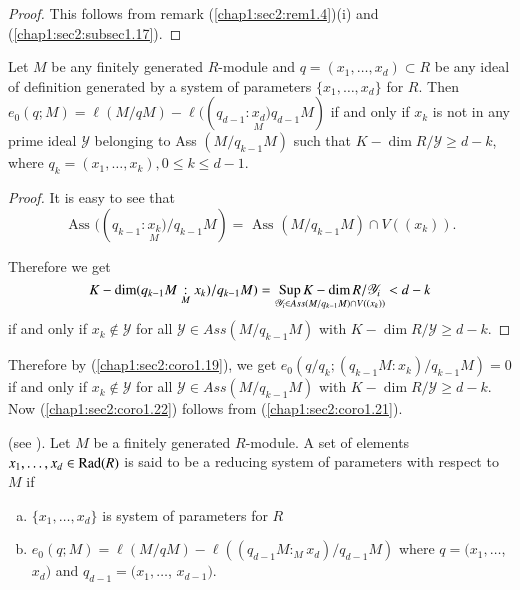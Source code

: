 \begin{proof}
  This follows from remark (\ref{chap1:sec2:rem1.4})(i) and
  (\ref{chap1:sec2:subsec1.17}). 
\end{proof}

\begin{corollary}\label{chap1:sec2:coro1.22}
 Let $M$ be any finitely generated $R$-module and $q=(x_1,
  \ldots, x_d) \subset R$ be any ideal of definition generated by a
  system of parameters $\{x_1, \ldots, x_d\}$ for $R$. Then
  $e_0(q;M)=\ell(M/qM)-\ell((q_{d-1}\underset{M}{:x_d)}q_{d-1} M)$ if
  and only if $x_k$ is not in any prime ideal $\mathscr{Y}$ belonging
  to Ass $(M/q_{k-1}M)$ such that $K-\dim R/\mathscr{Y} \geq d-k$,
  where $q_k =(x_1, \ldots, x_k), 0 \leq k \leq d-1$. 
\end{corollary}

\begin{proof}
  It is easy to see that 
  $$
  \text{ Ass } ((q_{k-1}\underset{M}{:x_k)}/q_{k-1}M)=\text{ Ass
  }(M/q_{k-1}M)\cap V((x_k)).  
  $$
  
  Therefore we get
  $$
  K-\dim(q_{k-1}M\underset{M}{:}x_k)/q_{k-1}M)= \underset {\mathscr{Y}_i
    \in Ass (M/q_{k-1}M)\cap V((x_k))}{\operatorname{Sup} K-\dim R/\mathscr{Y}_i} <d-k 
  $$
  if and only if $x_k \notin \mathscr{Y}$ for all $\mathscr{Y} \in Ass
  (M/q_{k-1}M)$ with $K-\dim R/\mathscr{Y} \geq d-k$.  
\end{proof}

Therefore by (\ref{chap1:sec2:coro1.19}), we get
$e_0(q/q_k;(q_{k-1}M:x_k)/q_{k-1}M)=0$ if and only if $x_k \notin
\mathscr{Y}$ for all $\mathscr{Y} \in Ass (M/q_{k-1}M)$ with $K-\dim
R/\mathscr{Y}\geq d-k$. Now (\ref{chap1:sec2:coro1.22}) follows from
(\ref{chap1:sec2:coro1.21}).   

\setcounter{definition}{22}
\begin{definition}\label{chap1:sec2:def1.23}
  (see \cite{2}). Let $M$ be a finitely generated $R$-module. A set of
  elements $x_1, \ldots, x_d \in \operatorname{Rad} (R)$ is said to be a 
  reducing system of parameters with respect to $M$ if  
  \begin{enumerate}[(a)]
  \item $\{ x_1, \ldots, x_d\}$ is system of parameters for $R$
  \item $e_0 (q; M) = \ell (M / q M ) -\ell ((q_{d-1}M:_M x_d)
    /q_{d-1}M)$ where $q = (x_1, \ldots$, $x_d)$ and $q_{d-1} = (x_1,
    \ldots$, $x_{d-1})$.  
  \end{enumerate}\pageoriginale
\end{definition}

